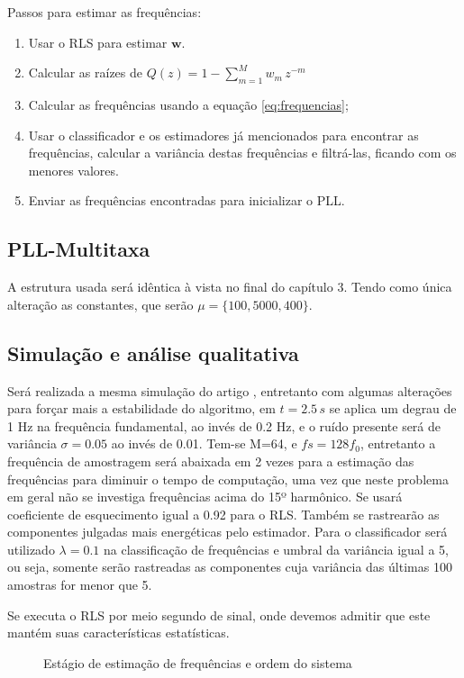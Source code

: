 Passos para estimar as frequências:

\begin{enumerate}
	\item Usar o RLS para estimar $\boldsymbol{w}$.
	\item Calcular as raízes de $Q(z)=1-\sum_{m=1}^{M}w_m \, z^{-m}$
	\item Calcular as frequências usando a equação \ref{eq:frequencias};
	\item Usar o classificador e os estimadores já mencionados para encontrar as frequências, calcular a variância destas frequências e filtrá-las, ficando com os menores valores.
	\item Enviar as frequências encontradas para inicializar o PLL.  
\end{enumerate}
	
\subsection{PLL-Multitaxa}
A estrutura usada será idêntica à vista no final do capítulo 3. Tendo como única alteração as constantes, que serão $\mu=\{100, 5000, 400\}$.

\subsection{Simulação e análise qualitativa}
Será realizada a mesma simulação do artigo \cite{chang2009two}, entretanto com algumas alterações para forçar mais a estabilidade do algoritmo, em $t=2.5 \, s$ se aplica um degrau de 1 Hz na frequência fundamental, ao invés de 0.2 Hz, e o ruído presente será de variância $\sigma=0.05$ ao invés de 0.01. Tem-se M=64, e $fs=128f_0$, entretanto a frequência de amostragem será abaixada em 2 vezes para a estimação das frequências para diminuir o tempo de computação, uma vez que neste problema em geral não se investiga frequências acima do 15º harmônico. Se usará coeficiente de esquecimento igual a 0.92 para o RLS. Também se rastrearão as componentes julgadas mais energéticas pelo estimador. Para o classificador será utilizado $\lambda=0.1$ na classificação de frequências e umbral da variância igual a 5, ou seja, somente serão rastreadas as componentes cuja variância das últimas 100 amostras for menor que 5. 

Se executa o RLS por meio segundo de sinal, onde devemos admitir que este mantém suas características estatísticas.

\begin{figure}[H]
	\centering    
	\def\svgwidth{\columnwidth}
	
	\caption{Estágio de estimação de frequências e ordem do sistema}
	\label{fig:estagio_1}
\end{figure}

